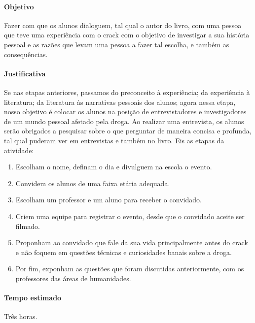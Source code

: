 \documentclass[12pt]{extarticle}
\begin{document}
\paragraph{Objetivo} Fazer  com que os alunos dialoguem, tal qual o autor do livro, 
	com uma pessoa que teve uma
	experiência com o crack com o objetivo de investigar a sua história pessoal 
	e as razões que levam uma pessoa a fazer tal escolha, e também as consequências. 

\paragraph{Justificativa} Se nas etapas anteriores, passamos do preconceito à experiência;
	da experiência à literatura; da literatura às narrativas pessoais dos alunos; agora
	nessa etapa, nosso objetivo é colocar os alunos na posição de entrevistadores
	e investigadores de um mundo pessoal afetado pela droga. Ao realizar uma entrevista, 
	os alunos serão obrigados a pesquisar sobre o que perguntar de maneira concisa e profunda, 
	tal qual puderam ver em entrevistas e também no livro. Eis as etapas da atividade:

\begin{enumerate}
	\paragraph{Metologia} 
	\item Escolham o nome, definam o dia e divulguem na escola o evento. 
	\item Convidem os alunos de uma faixa etária adequada. 
	\item Escolham um professor e um aluno para receber o convidado. 
	\item Criem uma equipe para registrar o evento, desde que o convidado
		aceite ser filmado. 
	\item Proponham ao convidado que fale da sua vida principalmente antes do crack e
		não foquem em questões técnicas e curiosidades banais sobre a droga. 
	\item Por fim, exponham as questões que foram discutidas anteriormente, 
		com os professores das áreas de humanidades. 
\end{enumerate}

\paragraph{Tempo estimado} Três horas.


\end{document}
